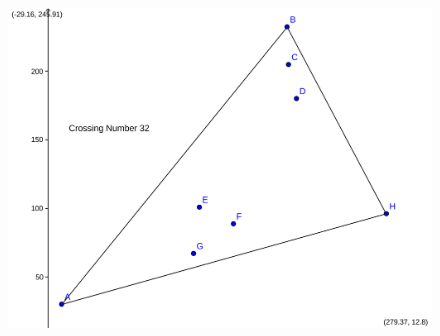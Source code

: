 \documentclass[11pt,epsf,times,letterpaper]{article}
\begin{document}
\begin{figure}
		\includegraphics[scale=.15]{png/o2923.png}
	\end{figure}
	
	
	
\end{document}

